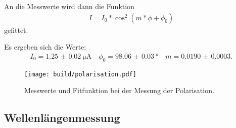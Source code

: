An die Messwerte wird dann die Funktion
\begin{align}
  I = I_0*\cos^2(m*\phi + \phi_0)
\end{align}
gefittet.

Es ergeben sich die Werte:
\begin{align}
  I_0 = \SI{1.25(2)}{\micro\ampere} \quad \phi_0 = \SI{98.06(3)}{\degree} \quad m = \num{0.0190(3)}.
\end{align}

\begin{figure}
  \centering
  \texttt{[image: build/polarisation.pdf]}
  \caption{Messwerte und Fitfunktion bei der Messung der Polarisation.}
  \label{fig:polarisation}
\end{figure}

\subsection{Wellenlängenmessung}
\label{sec:wellenlaenge}

